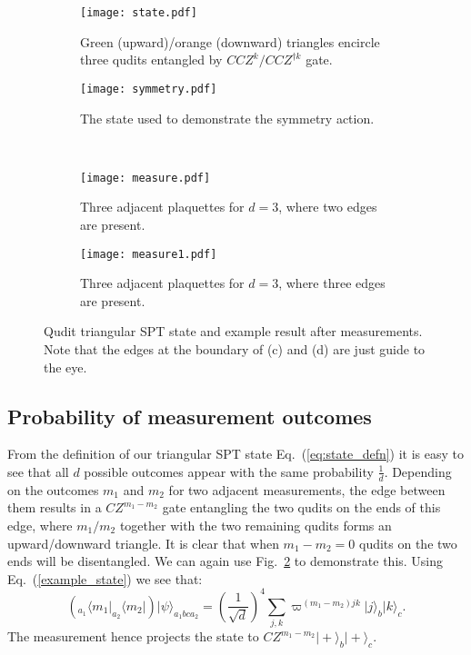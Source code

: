 \documentclass[aps,amsfonts,pra,twocolumn,showpacs]{revtex4-1}
\def\bra#1{\langle#1\vert}
\def\ket#1{\vert#1\rangle}
\newcommand{\be}{\begin{equation}}
\newcommand{\ee}{\end{equation}}
\begin{document}
\begin{figure}[h]
	\begin{subfigure}{0.22\textwidth}
		\centering
		\texttt{[image: state.pdf]}
		\caption{Green (upward)/orange (downward) triangles encircle three qudits entangled by $CCZ^k/CCZ^{\dagger k}$ gate. \label{state}}
	\end{subfigure}
	\hspace{1mm}
	\begin{subfigure}{0.22\textwidth}
		\centering
		\texttt{[image: symmetry.pdf]}
		\caption{The state used to demonstrate the symmetry action. \label{symmetry}}
	\end{subfigure} \\
	\vspace{10mm}
	\begin{subfigure}{0.22\textwidth}
		\centering
		\texttt{[image: measure.pdf]}
		\caption{Three adjacent plaquettes for $d=3$, where two edges are present. \label{measure}}
	\end{subfigure}
	\hspace{1mm}
	\begin{subfigure}{0.22\textwidth}
		\centering
		\texttt{[image: measure1.pdf]}
		\caption{Three adjacent plaquettes for $d=3$, where three edges are present. \label{measure1}}
	\end{subfigure}
	\caption{Qudit triangular SPT state and example result after measurements. Note that the edges at the boundary of (c) and (d) are just guide to the eye.}
\end{figure}

	\subsection{Probability of measurement outcomes} \label{sec:1st_step}
	
	From the definition of our triangular SPT state Eq.~(\ref{eq:state_defn}) it is easy to see that all $d$ possible outcomes appear with the same probability $\frac{1}{d}$. Depending on the outcomes $m_1$ and $m_2$ for two adjacent measurements, the edge between them results in a $CZ^{m_1-m_2}$ gate entangling the two qudits on the ends of this edge, where $m_1/m_2$ together with the two remaining qudits forms an upward/downward triangle. It is clear that when $m_1-m_2=0$ qudits on the two ends will be disentangled. We can again use Fig.~\ref{symmetry} to demonstrate this. Using Eq.~(\ref{example_state}) we see that:
		\be
		(_{a_1}\bra {m_1} _{a_2}\bra {m_2}) \ket \psi_{a_1bca_2} = (\frac{1}{\sqrt{d}})^4 \sum_{j, k} \varpi^{(m_1-m_2)jk} \ket j_b \ket k_c.
		\ee
	The measurement hence projects the state to $CZ^{m_1-m_2} \ket +_b \ket +_c$.
	
\end{document}
